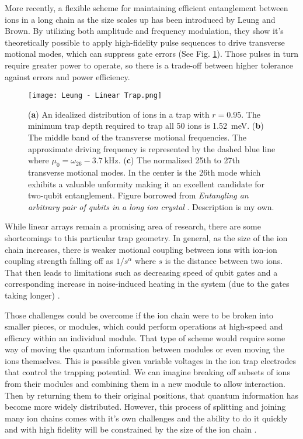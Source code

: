 More recently, a flexible scheme for maintaining efficient entanglement between ions in a long chain as the size scales up has been introduced by Leung and Brown. By utilizing both amplitude and frequency modulation, they show it's theoretically possible to apply high-fidelity pulse sequences to drive transverse motional modes, which can suppress gate errors (See Fig. \ref{fig:Linear Trap}). Those pulses in turn require greater power to operate, so there is a trade-off between higher tolerance against errors and power efficiency.

\begin{figure}[h]
    \texttt{[image: Leung - Linear Trap.png]}
    \caption{(\textbf{a}) An idealized distribution of ions in a trap with $r=0.95$. The minimum trap depth required to trap all 50 ions is \SI{1.52}{\milli\electronvolt}. (\textbf{b}) The middle band of the transverse motional frequencies. The approximate driving frequency is represented by the dashed blue line where $\mu_0 = \omega_{26} - \SI{3.7}{\kilo\hertz}$. (\textbf{c}) The normalized 25th to 27th transverse motional modes. In the center is the 26th mode which exhibits a valuable unformity making it an excellent candidate for two-qubit entanglement. Figure borrowed from \textit{Entangling an arbitrary pair of qubits in a long ion crystal} \cite{Leung}. Description is my own.}
    \label{fig:Linear Trap}
\end{figure}

While linear arrays remain a promising area of research, there are some shortcomings to this particular trap geometry. In general, as the size of the ion chain increases, there is weaker motional coupling between ions with ion-ion coupling strength falling off as $1/s^\alpha$ where $s$ is the distance between two ions. That then leads to limitations such as decreasing speed of qubit gates and a corresponding increase in noise-induced heating in the system (due to the gates taking longer) \cite{Bruzewicz}.

Those challenges could be overcome if the ion chain were to be broken into smaller pieces, or modules, which could perform operations at high-speed and efficacy within an individual module. That type of scheme would require some way of moving the quantum information between modules or even moving the ions themselves. This is possible given variable voltages in the ion trap electrodes that control the trapping potential. We can imagine breaking off subsets of ions from their modules and combining them in a new module to allow interaction. Then by returning them to their original positions, that quantum information has become more widely distributed. However, this process of splitting and joining many ion chains comes with it's own challenges and the ability to do it quickly and with high fidelity will be constrained by the size of the ion chain \cite{Bruzewicz}.

